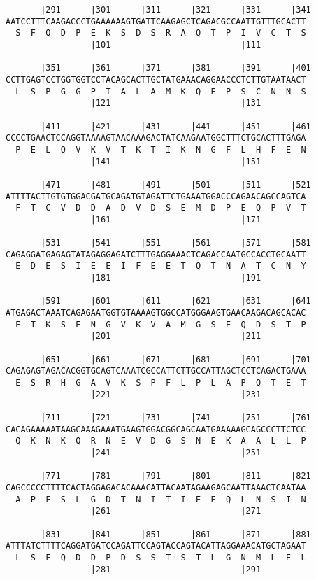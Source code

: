 \documentclass{article}
\begin{document}
\begin{Verbatim}
       |291      |301      |311      |321      |331      |341
AATCCTTTCAAGACCCTGAAAAAAGTGATTCAAGAGCTCAGACGCCAATTGTTTGCACTT
  S  F  Q  D  P  E  K  S  D  S  R  A  Q  T  P  I  V  C  T  S
                 |101                          |111         
  
       |351      |361      |371      |381      |391      |401
CCTTGAGTCCTGGTGGTCCTACAGCACTTGCTATGAAACAGGAACCCTCTTGTAATAACT
  L  S  P  G  G  P  T  A  L  A  M  K  Q  E  P  S  C  N  N  S
                 |121                          |131         
  
       |411      |421      |431      |441      |451      |461
CCCCTGAACTCCAGGTAAAAGTAACAAAGACTATCAAGAATGGCTTTCTGCACTTTGAGA
  P  E  L  Q  V  K  V  T  K  T  I  K  N  G  F  L  H  F  E  N
                 |141                          |151         
  
       |471      |481      |491      |501      |511      |521
ATTTTACTTGTGTGGACGATGCAGATGTAGATTCTGAAATGGACCCAGAACAGCCAGTCA
  F  T  C  V  D  D  A  D  V  D  S  E  M  D  P  E  Q  P  V  T
                 |161                          |171         
  
       |531      |541      |551      |561      |571      |581
CAGAGGATGAGAGTATAGAGGAGATCTTTGAGGAAACTCAGACCAATGCCACCTGCAATT
  E  D  E  S  I  E  E  I  F  E  E  T  Q  T  N  A  T  C  N  Y
                 |181                          |191         
  
       |591      |601      |611      |621      |631      |641
ATGAGACTAAATCAGAGAATGGTGTAAAAGTGGCCATGGGAAGTGAACAAGACAGCACAC
  E  T  K  S  E  N  G  V  K  V  A  M  G  S  E  Q  D  S  T  P
                 |201                          |211         
  
       |651      |661      |671      |681      |691      |701
CAGAGAGTAGACACGGTGCAGTCAAATCGCCATTCTTGCCATTAGCTCCTCAGACTGAAA
  E  S  R  H  G  A  V  K  S  P  F  L  P  L  A  P  Q  T  E  T
                 |221                          |231         
  
       |711      |721      |731      |741      |751      |761
CACAGAAAAATAAGCAAAGAAATGAAGTGGACGGCAGCAATGAAAAAGCAGCCCTTCTCC
  Q  K  N  K  Q  R  N  E  V  D  G  S  N  E  K  A  A  L  L  P
                 |241                          |251         
  
       |771      |781      |791      |801      |811      |821
CAGCCCCCTTTTCACTAGGAGACACAAACATTACAATAGAAGAGCAATTAAACTCAATAA
  A  P  F  S  L  G  D  T  N  I  T  I  E  E  Q  L  N  S  I  N
                 |261                          |271         
  
       |831      |841      |851      |861      |871      |881
ATTTATCTTTTCAGGATGATCCAGATTCCAGTACCAGTACATTAGGAAACATGCTAGAAT
  L  S  F  Q  D  D  P  D  S  S  T  S  T  L  G  N  M  L  E  L
                 |281                          |291         
  

\end{Verbatim}
\end{document}
